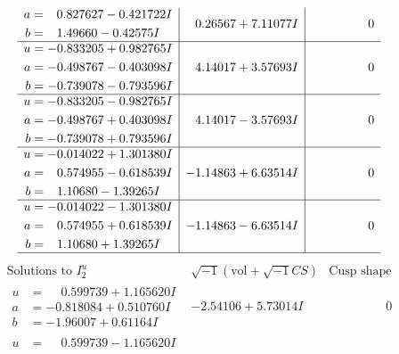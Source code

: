\documentclass[1p]{elsarticle_modified}
\theoremstyle{definition}
\newcommand{\I}{\sqrt{-1}}
\begin{document}
$$\begin{array}{c|c|c}
\begin{aligned}
a &= \phantom{-}0.827627 - 0.421722 I \\
b &= \phantom{-}1.49660 - 0.42575 I\end{aligned}
 & \phantom{-}0.26567 + 7.11077 I & \phantom{-0.000000 } 0 \\ \hline\begin{aligned}
u &= -0.833205 + 0.982765 I \\
a &= -0.498767 - 0.403098 I \\
b &= -0.739078 - 0.793596 I\end{aligned}
 & \phantom{-}4.14017 + 3.57693 I & \phantom{-0.000000 } 0 \\ \hline\begin{aligned}
u &= -0.833205 - 0.982765 I \\
a &= -0.498767 + 0.403098 I \\
b &= -0.739078 + 0.793596 I\end{aligned}
 & \phantom{-}4.14017 - 3.57693 I & \phantom{-0.000000 } 0 \\ \hline\begin{aligned}
u &= -0.014022 + 1.301380 I \\
a &= \phantom{-}0.574955 - 0.618539 I \\
b &= \phantom{-}1.10680 - 1.39265 I\end{aligned}
 & -1.14863 + 6.63514 I & \phantom{-0.000000 } 0 \\ \hline\begin{aligned}
u &= -0.014022 - 1.301380 I \\
a &= \phantom{-}0.574955 + 0.618539 I \\
b &= \phantom{-}1.10680 + 1.39265 I\end{aligned}
 & -1.14863 - 6.63514 I & \phantom{-0.000000 } 0\\
 \hline 
 \end{array}$$\newpage$$\begin{array}{c|c|c}  
\text{Solutions to }I^u_{2}& \I (\text{vol} + \sqrt{-1}CS) & \text{Cusp shape}\\
 \hline 
\begin{aligned}
u &= \phantom{-}0.599739 + 1.165620 I \\
a &= -0.818084 + 0.510760 I \\
b &= -1.96007 + 0.61164 I\end{aligned}
 & -2.54106 + 5.73014 I & \phantom{-0.000000 } 0 \\ \hline\begin{aligned}
u &= \phantom{-}0.599739 - 1.165620 I \\

\end{aligned}
\end{array}$$
\end{document}
